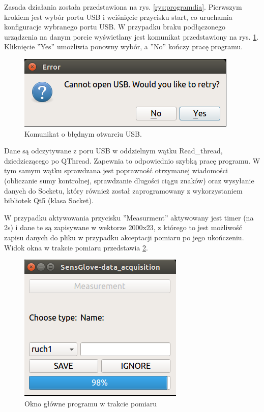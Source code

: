 \documentclass{article}
\begin{document}
Zasada działania została przedstawiona na rys. \ref{rys:programdia}. 
Pierwszym krokiem jest wybór portu USB i wciśnięcie przycisku start, co uruchamia konfiguracje wybranego portu USB. W przypadku braku podłączonego urządzenia na danym porcie wyświetlany jest komunikat przedstawiony na rys. \ref{rys:oknousb}. Kliknięcie ''Yes'' umożliwia ponowny wybór, a ''No'' kończy pracę programu.\\
\begin{figure}[H]
    \begin{center}
    \includegraphics[scale=0.6]{oknousb.png}
    \caption{Komunikat o błędnym otwarciu USB.}
    \label{rys:oknousb}
    \end{center}
\end{figure}
Dane są odczytywane z poru USB w oddzielnym wątku Read\_thread, dziedziczącego po QThread. Zapewnia to odpowiednio szybką pracę programu. W tym samym wątku sprawdzana jest poprawność otrzymanej wiadomości (obliczanie sumy kontrolnej, sprawdzanie dlugości ciągu znaków) oraz wysyłanie danych do Socketu, który również został zaprogramowany z wykorzystaniem bibliotek Qt5 (klasa Socket).

W przypadku aktywowania przycisku ''Measurment'' aktywowany jest timer (na 2s) i dane te są zapisywane w wektorze 2000x23, z którego to jest możliwość zapisu danych do pliku w przypadku akceptacji pomiaru po jego ukończeniu. Widok okna w trakcie pomiaru przedstawia \ref{rys:oknopomiar}.
\begin{figure}[H]
    \centering
    \includegraphics[scale=0.6]{oknopomiar.png}
    \caption{Okno główne programu w trakcie pomiaru}
    \label{rys:oknopomiar}
\end{figure}
\end{document}

